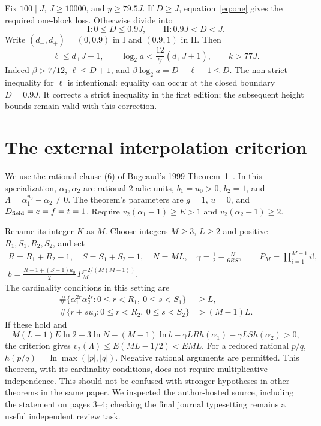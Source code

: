 \documentclass[11pt]{article}
\theoremstyle{definition}\newtheorem{definition}[theorem]{Definition}
\newcommand{\lb}{\log_2}
\newcommand{\val}{v_2}
\begin{document}
Fix $100\mid J$, $J\ge10000$, and $y\ge79.5J$. If $D\ge J$, equation~\eqref{eq:one} gives the required one-block loss. Otherwise divide into
\[
 \mathrm{I}:0\le D\le0.9J,\qquad \mathrm{II}:0.9J<D<J.
\]
Write $(d_-,d_+)=(0,0.9)$ in I and $(0.9,1)$ in II. Then
\begin{equation}\label{eq:heightrestr}
 \ell\le d_+J+1,\qquad \lb a<\frac{12}{7}(d_+J+1),\qquad k>77J.
\end{equation}
Indeed $\beta>7/12$, $\ell\le D+1$, and $\beta\lb a=D-\ell+1\le D$. The non-strict inequality for $\ell$ is intentional: equality can occur at the closed boundary $D=0.9J$. It corrects a strict inequality in the first edition; the subsequent height bounds remain valid with this correction.

\section{The external interpolation criterion}\label{sec:criterion}
We use the rational clause (6) of Bugeaud's 1999 Theorem~1~\cite{bugeaud99}. In this specialization, $\alpha_1,\alpha_2$ are rational $2$-adic units, $b_1=u_0>0$, $b_2=1$, and $\Lambda=\alpha_1^{u_0}-\alpha_2\ne0$. The theorem's parameters are $g=1$, $u=0$, and $D_{\rm field}=e=f=t=1$. Require $\val(\alpha_1-1)\ge E>1$ and $\val(\alpha_2-1)\ge2$.

Rename its integer $K$ as $M$. Choose integers $M\ge3$, $L\ge2$ and positive $R_1,S_1,R_2,S_2$, and set
\begin{gather*}
 R=R_1+R_2-1,\quad S=S_1+S_2-1,\quad N=ML,\quad
 \gamma=\tfrac12-\frac{N}{6RS},\qquad P_M=\prod_{i=1}^{M-1}i!,\\
 b=\frac{R-1+(S-1)u_0}{2}\,P_M^{-2/(M(M-1))}.
\end{gather*}
The cardinality conditions in this setting are
\begin{align*}
 \#\{\alpha_1^{2r}\alpha_2^{2s}:0\le r<R_1,\ 0\le s<S_1\}&\ge L,\\
 \#\{r+su_0:0\le r<R_2,\ 0\le s<S_2\}&>(M-1)L.
\end{align*}
If these hold and
\begin{equation}\label{eq:interp}
 M(L-1)E\ln2-3\ln N-(M-1)\ln b
 -\gamma LRh(\alpha_1)-\gamma LSh(\alpha_2)>0,
\end{equation}
the criterion gives $\val(\Lambda)\le E(ML-1/2)<EML$. For a reduced rational $p/q$, $h(p/q)=\ln\max(|p|,|q|)$. Negative rational arguments are permitted. This theorem, with its cardinality conditions, does not require multiplicative independence. This should not be confused with stronger hypotheses in other theorems in the same paper. We inspected the author-hosted source, including the statement on pages 3--4; checking the final journal typesetting remains a useful independent review task.
\end{document}
